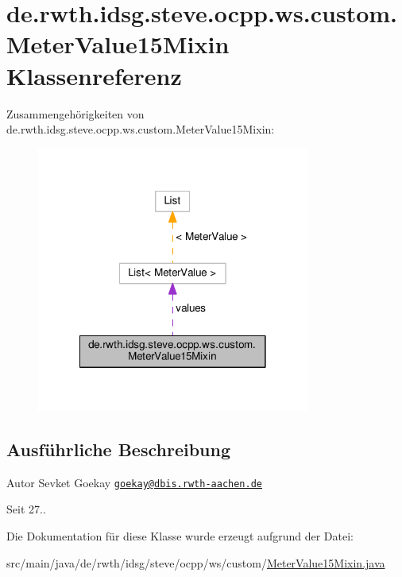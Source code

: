 \hypertarget{classde_1_1rwth_1_1idsg_1_1steve_1_1ocpp_1_1ws_1_1custom_1_1_meter_value15_mixin}{\section{de.\-rwth.\-idsg.\-steve.\-ocpp.\-ws.\-custom.\-Meter\-Value15\-Mixin Klassenreferenz}
\label{classde_1_1rwth_1_1idsg_1_1steve_1_1ocpp_1_1ws_1_1custom_1_1_meter_value15_mixin}
}


Zusammengehörigkeiten von de.\-rwth.\-idsg.\-steve.\-ocpp.\-ws.\-custom.\-Meter\-Value15\-Mixin\-:\nopagebreak
\begin{figure}[H]
\begin{center}
\leavevmode
\includegraphics[width=254pt]{classde_1_1rwth_1_1idsg_1_1steve_1_1ocpp_1_1ws_1_1custom_1_1_meter_value15_mixin__coll__graph}
\end{center}
\end{figure}


\subsection{Ausführliche Beschreibung}
\begin{DoxyAuthor}{Autor}
Sevket Goekay \href{mailto:goekay@dbis.rwth-aachen.de}{\tt goekay@dbis.\-rwth-\/aachen.\-de} 
\end{DoxyAuthor}
\begin{DoxySince}{Seit}
27.. 
\end{DoxySince}


Die Dokumentation für diese Klasse wurde erzeugt aufgrund der Datei\-:\begin{DoxyCompactItemize}
\item 
src/main/java/de/rwth/idsg/steve/ocpp/ws/custom/\hyperlink{_meter_value15_mixin_8java}{Meter\-Value15\-Mixin.\-java}\end{DoxyCompactItemize}
